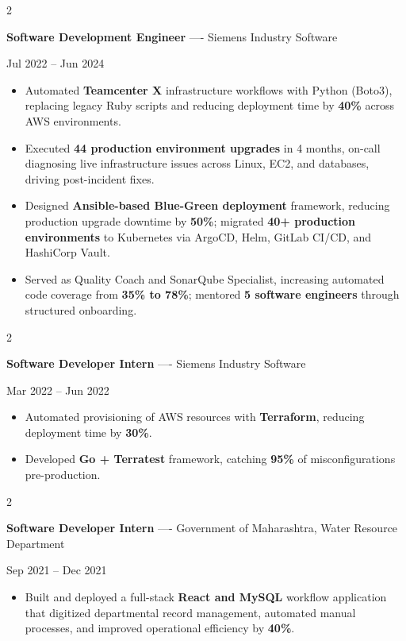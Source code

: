 \documentclass[10pt, letterpaper]{article}
\newenvironment{highlights}{
    \begin{itemize}[
        topsep=0.10 cm,
        parsep=0.06 cm,
        partopsep=0pt,
        itemsep=0.06 cm,
        leftmargin=12pt
    ]
}{
    \end{itemize}
}
\newenvironment{twocolentry}[2][]{
    \onecolentry
    \def\secondColumn{#2}
    \setcolumnwidth{\fill, 4.5 cm}
    \begin{paracol}{2}
}{
    \switchcolumn \raggedleft \secondColumn
    \end{paracol}
    \endonecolentry
}
\begin{document}
\vspace{0.15 cm}

\begin{twocolentry}{Jul 2022 -- Jun 2024}
\textbf{Software Development Engineer} ---- Siemens Industry Software
\end{twocolentry}
\begin{highlights}
  \item Automated \textbf{Teamcenter X} infrastructure workflows with Python (Boto3), replacing legacy Ruby scripts and reducing deployment time by \textbf{40\%} across AWS environments.
  \item Executed \textbf{44 production environment upgrades} in 4 months, on-call diagnosing live infrastructure issues across Linux, EC2, and databases, driving post-incident fixes.
  \item Designed \textbf{Ansible-based Blue-Green deployment} framework, reducing production upgrade downtime by \textbf{50\%}; migrated \textbf{40+ production environments} to Kubernetes via ArgoCD, Helm, GitLab CI/CD, and HashiCorp Vault.
  \item Served as Quality Coach and SonarQube Specialist, increasing automated code coverage from \textbf{35\% to 78\%}; mentored \textbf{5 software engineers} through structured onboarding.
\end{highlights}

\vspace{0.15 cm}

\begin{twocolentry}{Mar 2022 -- Jun 2022}
\textbf{Software Developer Intern} ---- Siemens Industry Software
\end{twocolentry}
\begin{highlights}
  \item Automated provisioning of AWS resources with \textbf{Terraform}, reducing deployment time by \textbf{30\%}.
  \item Developed \textbf{Go + Terratest} framework, catching \textbf{95\%} of misconfigurations pre-production.
\end{highlights}

\vspace{0.15 cm}

\begin{twocolentry}{Sep 2021 -- Dec 2021}
\textbf{Software Developer Intern} ---- Government of Maharashtra, Water Resource Department
\end{twocolentry}
\begin{highlights}
  \item Built and deployed a full-stack \textbf{React and MySQL} workflow application that digitized departmental record management, automated manual processes, and improved operational efficiency by \textbf{40\%}.
\end{highlights}
\end{document}
